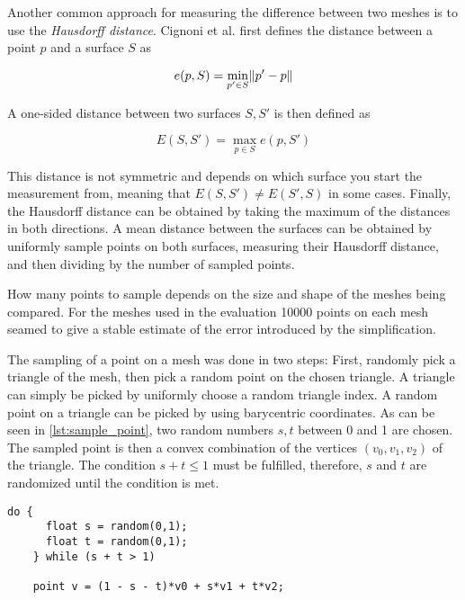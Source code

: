 Another common approach for measuring the difference between two meshes is to use the \emph{Hausdorff distance}. Cignoni et al. \cite{cignoni1998metro} first defines the distance between a point $p$ and a surface $S$ as

\[e(p, S) = \min_{p' \in S} \norm*{p' - p}\]

A one-sided distance between two surfaces \(S, S'\) is then defined as

\[E(S, S') = \max_{p \in S} e(p, S')\]

This distance is not symmetric and depends on which surface you start the measurement from, meaning that \(E(S, S') \neq E(S', S)\) in some cases. Finally, the Hausdorff distance can be obtained by taking the maximum of the distances in both directions. A mean distance between the surfaces can be obtained by uniformly sample points on both surfaces, measuring their Hausdorff distance, and then dividing by the number of sampled points.

How many points to sample depends on the size and shape of the meshes being compared. For the meshes used in the evaluation 10000 points on each mesh seamed to give a stable estimate of the error introduced by the simplification.

The sampling of a point on a mesh was done in two steps: First, randomly pick a triangle of the mesh, then pick a random point on the chosen triangle. A triangle can simply be picked by uniformly choose a random triangle index. A random point on a triangle can be picked by using barycentric coordinates. As can be seen in \cref{lst:sample_point}, two random numbers \(s, t\) between 0 and 1 are chosen. The sampled point is then a convex combination of the vertices \((v_0, v_1, v_2)\) of the triangle. The condition \(s + t \leq 1\) must be fulfilled, therefore, $s$ and $t$ are randomized until the condition is met.  

\begin{minipage}{\textwidth}
  \begin{lstlisting}[caption={Sampling point on triangle by using barycentric coordinates}, label={lst:sample_point}]
    do {
      float s = random(0,1);
      float t = random(0,1);
    } while (s + t > 1)

    point v = (1 - s - t)*v0 + s*v1 + t*v2;
  \end{lstlisting}
\end{minipage}

